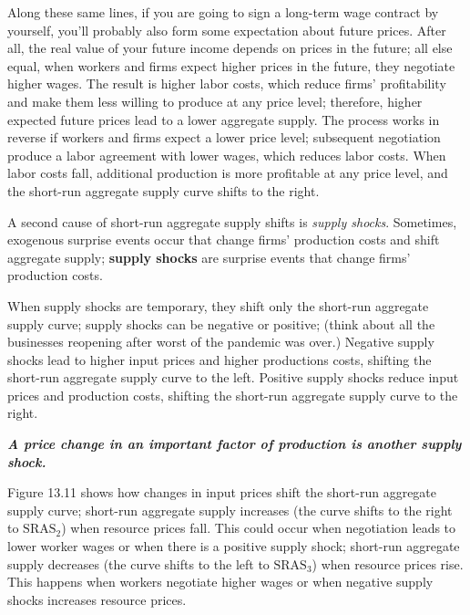 \documentclass[11pt]{article} %
\begin{document}
Along these same lines, if you are going to sign a long-term wage contract by yourself, you'll probably also form some expectation about future prices. After all, the real value of your future income depends on prices in the future; all else equal, when workers and firms expect higher prices in the future, they negotiate higher wages. The result is higher labor costs, which reduce firms' profitability and make them less willing to produce at any price level; therefore, higher expected future prices lead to a lower aggregate supply. The process works in reverse if workers and firms expect a lower price level; subsequent negotiation produce a labor agreement with lower wages, which reduces labor costs. When labor costs fall, additional production is more profitable at any price level, and the short-run aggregate supply curve shifts to the right.

A second cause of short-run aggregate supply shifts is \textit{supply shocks}. Sometimes, exogenous surprise events occur that change firms' production costs and shift aggregate supply; \textbf{supply shocks} are surprise events that change firms' production costs.

When supply shocks are temporary, they shift only the short-run aggregate supply curve; supply shocks can be negative or positive; (think about all the businesses reopening after worst of the pandemic was over.) Negative supply shocks lead to higher input prices and higher productions costs, shifting the short-run aggregate supply curve to the left. Positive supply shocks reduce input prices and production costs, shifting the short-run aggregate supply curve to the right.

\textbf{\textit{A price change in an important factor of production is another supply shock.}}

Figure 13.11 shows how changes in input prices shift the short-run aggregate supply curve; short-run aggregate supply increases (the curve shifts to the right to \(\text{SRAS}_2\)) when resource prices fall. This could occur when negotiation leads to lower worker wages or when there is a positive supply shock; short-run aggregate supply decreases (the curve shifts to the left to \(\text{SRAS}_3\)) when resource prices rise. This happens when workers negotiate higher wages or when negative supply shocks increases resource prices.
\end{document}
